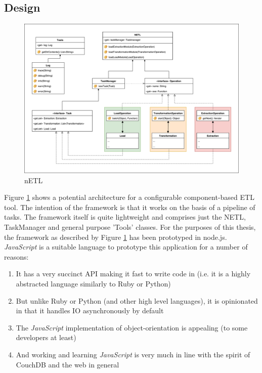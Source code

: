 \subsection{Design}

\begin{figure}[h]
    \centering
    \includegraphics[scale=0.4]{./resources/figures/netlUML}
    \caption[nETL]{nETL}
    \label{nETL}
\end{figure}

Figure \ref{nETL} shows a potential architecture for a configurable component-based ETL tool. The intention of the framework is that it works on the basis of a pipeline of tasks. The framework itself is quite lightweight and comprises just the NETL, TaskManager and general purpose 'Tools' classes. For the purposes of this thesis, the framework as described by Figure \ref{nETL} has been prototyped in node.js. \textit{JavaScript} is a suitable language to prototype this application for a number of reasons:

\begin{enumerate}
    \item It has a very succinct API making it fast to write code in (i.e. it is a highly abstracted language similarly to Ruby or Python)
    \item But unlike Ruby or Python (and other high level languages), it is opinionated in that it handles IO asynchronously by default
    \item The \textit{JavaScript} implementation of object-orientation is appealing (to some developers at least)
    \item And working and learning \textit{JavaScript} is very much in line with the spirit of CouchDB and the web in general
\end{enumerate}

